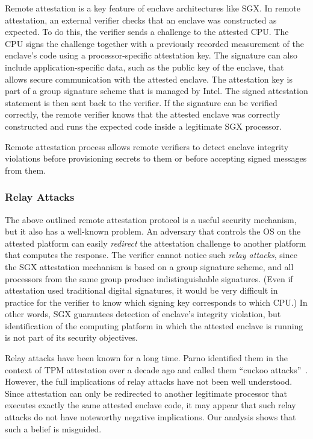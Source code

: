 \documentclass[letterpaper,twocolumn,10pt]{article}
\begin{document}
Remote attestation is a key feature of enclave architectures like SGX. In remote attestation, an external verifier checks that an enclave was constructed as expected. To do this, the verifier sends a challenge to the attested CPU. The CPU signs the challenge together with a previously recorded measurement of the enclave's code using a processor-specific attestation key. The signature can also include application-specific data, such as the public key of the enclave, that allows secure communication with the attested enclave. The attestation key is part of a group signature scheme that is managed by Intel. The signed attestation statement is then sent back to the verifier. If the signature can be verified correctly, the remote verifier knows that the attested enclave was correctly constructed and runs the expected code inside a legitimate SGX processor. 

Remote attestation process allows remote verifiers to detect enclave integrity violations before provisioning secrets to them or before accepting signed messages from them.  


\subsubsection*{Relay Attacks}

The above outlined remote attestation protocol is a useful security mechanism, but it also has a well-known problem. 
An adversary that controls the OS on the attested platform can easily \emph{redirect} the attestation challenge to another platform that computes the response. 
The verifier cannot notice such \emph{relay attacks}, since the SGX attestation mechanism is based on a group signature scheme, and all processors from the same group produce indistinguishable signatures. (Even if attestation used traditional digital signatures, it would be very difficult in practice for the verifier to know which signing key corresponds to which CPU.) In other words, SGX guarantees detection of enclave's integrity violation, but  identification of the computing platform in which the attested enclave is running is not part of its security objectives.

Relay attacks have been known for a long time. Parno identified them in the context of TPM attestation over a decade ago and called them ``cuckoo attacks''~\cite{parno2008bootstrapping}. However, the full implications of relay attacks have not been well understood. Since attestation can only be redirected to another legitimate processor that executes exactly the same attested enclave code, it may appear that such relay attacks do not have noteworthy negative implications. Our analysis shows that such a belief is misguided.
\end{document}
